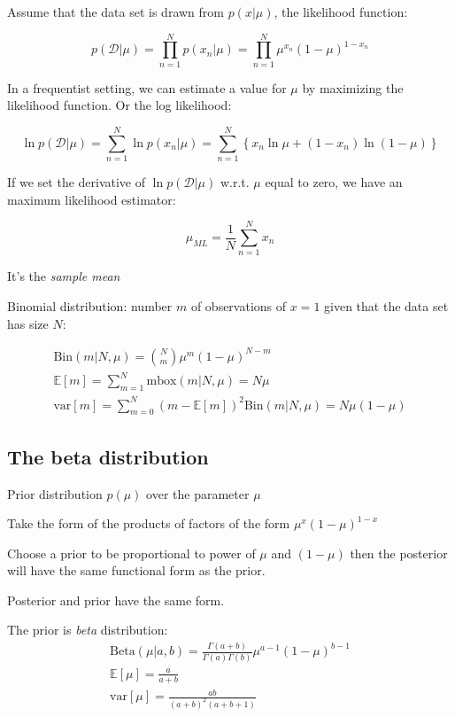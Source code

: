 Assume that the data set is drawn from $p(x|\mu)$, the likelihood
function:

\[ 
    p(\mathcal{D}|\mu) = \prod_{n=1}^N p(x_n|\mu) = \prod_{n=1}^N
    \mu^{x_n}{(1-\mu)}^{1-x_n}
\]

In a frequentist setting, we can estimate a value for $\mu$ by maximizing
the likelihood function. Or the log likelihood:

\[
    \ln p(\mathcal{D}|\mu) = \sum_{n=1}^N \ln p(x_n|\mu) =
    \sum_{n=1}^N\left\{ x_n \ln \mu + (1-x_n)\ln(1-\mu) \right\}
\]

If we set the derivative of $\ln p(\mathcal{D}|\mu)$ w.r.t. $\mu$ equal to
zero, we have an maximum likelihood estimator:

\[
    \mu_{ML} = \frac{1}{N}\sum_{n=1}^N x_n
\]

It's the \emph{sample mean}

Binomial distribution: number $m$ of observations of $x=1$ given that the
data set has size $N$:

\begin{align*}
    \mbox{Bin}(m|N, \mu) = {N \choose m} \mu^m{(1-\mu)}^{N-m} \\
    \mathbb{E}[m] = \sum_{m=1}^N \mbox{mbox}(m|N, \mu) = N\mu \\
    \mbox{var}[m] = \sum_{m=0}^N {(m -\mathbb{E}[m])}^2 \mbox{Bin}(m|N,
    \mu) = N \mu (1-\mu)
\end{align*}

\subsection{The beta distribution}
Prior distribution $p(\mu)$ over the parameter $\mu$

Take the form of the products of factors of the form
$\mu^x{(1-\mu)}^{1-x}$

Choose a prior to be proportional to power of $\mu$ and $(1-\mu)$ then the
posterior will have the same functional form as the prior.

Posterior and prior have the same form.

The prior is \emph{beta} distribution:
\begin{align*}
    \mbox{Beta}(\mu|a, b) = \frac{\Gamma(a+b)}{\Gamma(a)\Gamma(b)}
    \mu^{a-1}{(1-\mu)}^{b-1} \\
    \mathbb{E}[\mu] = \frac{a}{a+b}\\
    \mbox{var}[\mu] = \frac{ab}{{(a+b)}^2(a+b+1)}
\end{align*}

